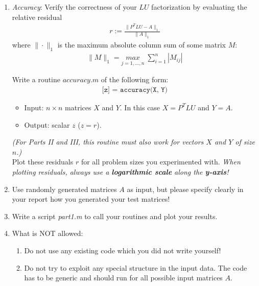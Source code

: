 \documentclass{scrartcl}
\begin{document}
    \begin{enumerate}
        \item \textit{Accuracy}: Verify the correctness of your $LU$ factorization by evaluating the relative residual
        \begin{align*}
            r := \frac{\|P^TLU - A\|_{1}}{\|A\|_{1}}
        \end{align*}
        where $\|\cdot\|_{1}$ is the maximum absolute column sum of some matrix $M$:
        \begin{align*}
            \|M\|_{1} = \underset{j = 1, \dots, n}{max} \; \sum_{i=1}^{n} |M_{ij}|
        \end{align*}

Write a routine $accuracy.m$ of the following form:
     	\begin{align*}
            	\texttt{[z] = accuracy(X, Y)}
        \end{align*}
		\begin{itemize}
            	\item Input: $n \times n$ matrices $X$ and $Y$. In this case $X = P^TLU$ and $Y = A$.
            	\item Output: scalar $z$ ($z = r$).
        \end{itemize}
		
		\textit{(For Parts II and III, this routine must also work for vectors $X$ and $Y$ of size $n$.)}\\
		
		

        Plot these residuals $r$ for all problem sizes you experimented with.
        \emph{When plotting residuals, always use a \textbf{logarithmic scale} along the \textbf{y-axis}!}
 
        
        \item Use randomly generated matrices $A$ as input, but please specify clearly in your report how you generated your test matrices!
      

        \item Write a script \textit{part1.m} to call your routines and plot your results.
      
        
        \item What is NOT allowed:
            \begin{enumerate}
                \item Do not use any existing code which you did not write yourself!
                \item Do not try to exploit any special structure in the input data. The code has to be generic and should run for all possible input matrices $A$.
            \end{enumerate}
    \end{enumerate}
    
\end{document}
